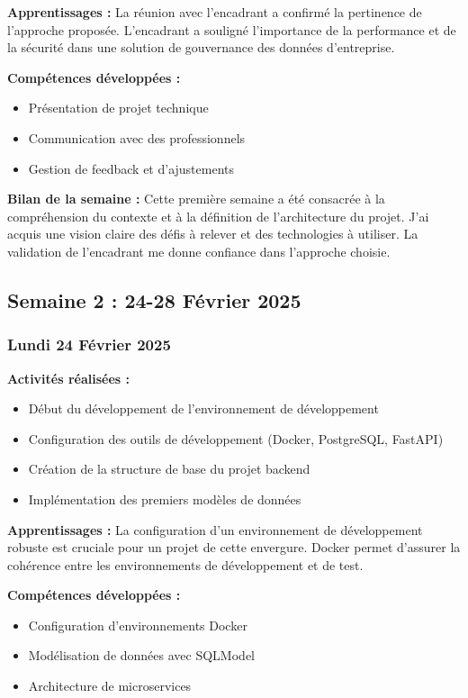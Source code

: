 \documentclass[12pt,a4paper]{article}
\begin{document}
\textbf{Apprentissages :}
La réunion avec l'encadrant a confirmé la pertinence de l'approche proposée. L'encadrant a souligné l'importance de la performance et de la sécurité dans une solution de gouvernance des données d'entreprise.

\textbf{Compétences développées :}
\begin{itemize}
    \item Présentation de projet technique
    \item Communication avec des professionnels
    \item Gestion de feedback et d'ajustements
\end{itemize}

\textbf{Bilan de la semaine :}
Cette première semaine a été consacrée à la compréhension du contexte et à la définition de l'architecture du projet. J'ai acquis une vision claire des défis à relever et des technologies à utiliser. La validation de l'encadrant me donne confiance dans l'approche choisie.

\clearpage
\subsection{Semaine 2 : 24-28 Février 2025}

\subsubsection{Lundi 24 Février 2025}
\textbf{Activités réalisées :}
\begin{itemize}
    \item Début du développement de l'environnement de développement
    \item Configuration des outils de développement (Docker, PostgreSQL, FastAPI)
    \item Création de la structure de base du projet backend
    \item Implémentation des premiers modèles de données
\end{itemize}

\textbf{Apprentissages :}
La configuration d'un environnement de développement robuste est cruciale pour un projet de cette envergure. Docker permet d'assurer la cohérence entre les environnements de développement et de test.

\textbf{Compétences développées :}
\begin{itemize}
    \item Configuration d'environnements Docker
    \item Modélisation de données avec SQLModel
    \item Architecture de microservices
\end{itemize}
\end{document}
